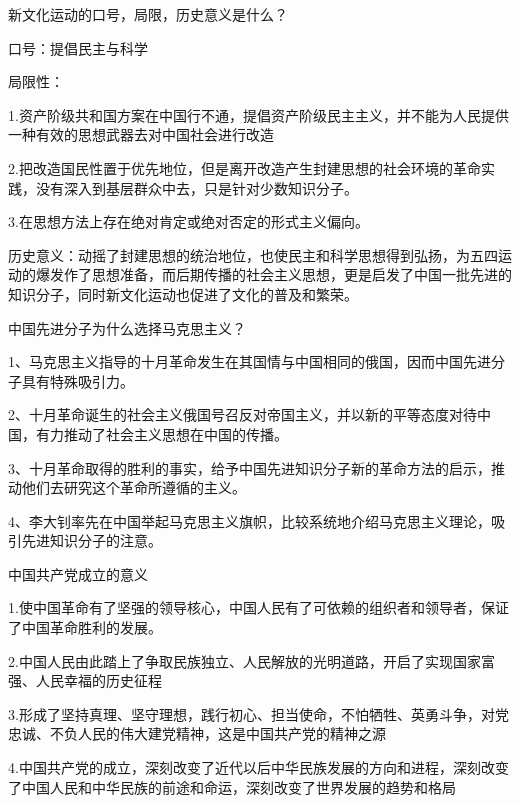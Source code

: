 \documentclass[lang=cn,10pt]{elegantbook}
\begin{document}
	\begin{example}
		新文化运动的口号，局限，历史意义是什么？
	\end{example}
	\begin{solution}
		
		口号：提倡民主与科学
		
		局限性：
		
		1.资产阶级共和国方案在中国行不通，提倡资产阶级民主主义，并不能为人民提供一种有效的思想武器去对中国社会进行改造
		
		2.把改造国民性置于优先地位，但是离开改造产生封建思想的社会环境的革命实践，没有深入到基层群众中去，只是针对少数知识分子。
		
		3.在思想方法上存在绝对肯定或绝对否定的形式主义偏向。
		
		历史意义：动摇了封建思想的统治地位，也使民主和科学思想得到弘扬，为五四运动的爆发作了思想准备，而后期传播的社会主义思想，更是启发了中国一批先进的知识分子，同时新文化运动也促进了文化的普及和繁荣。
	\end{solution}
	\begin{example}
		中国先进分子为什么选择马克思主义？
	\end{example}
	\begin{solution}
		
		1、马克思主义指导的十月革命发生在其国情与中国相同的俄国，因而中国先进分子具有特殊吸引力。

		2、十月革命诞生的社会主义俄国号召反对帝国主义，并以新的平等态度对待中国，有力推动了社会主义思想在中国的传播。

		3、十月革命取得的胜利的事实，给予中国先进知识分子新的革命方法的启示，推动他们去研究这个革命所遵循的主义。

		4、李大钊率先在中国举起马克思主义旗帜，比较系统地介绍马克思主义理论，吸引先进知识分子的注意。
	\end{solution}
	\begin{example}
		中国共产党成立的意义
	\end{example}
	\begin{solution}
		
		1.使中国革命有了坚强的领导核心，中国人民有了可依赖的组织者和领导者，保证了中国革命胜利的发展。
		
		2.中国人民由此踏上了争取民族独立、人民解放的光明道路，开启了实现国家富强、人民幸福的历史征程
		
		3.形成了坚持真理、坚守理想，践行初心、担当使命，不怕牺牲、英勇斗争，对党忠诚、不负人民的伟大建党精神，这是中国共产党的精神之源
		
		4.中国共产党的成立，深刻改变了近代以后中华民族发展的方向和进程，深刻改变了中国人民和中华民族的前途和命运，深刻改变了世界发展的趋势和格局
	
	\end{solution}
\end{document}
